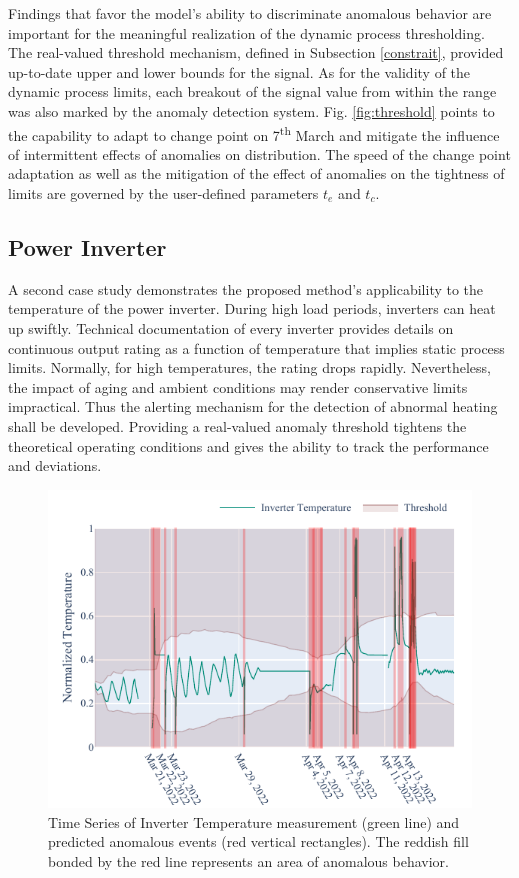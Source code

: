 Findings that favor the model's ability to discriminate anomalous behavior are important for the meaningful realization of the dynamic process thresholding. The real-valued threshold mechanism, defined in Subsection \ref{constrait}, provided up-to-date upper and lower bounds for the signal. As for the validity of the dynamic process limits, each breakout of the signal value from within the range was also marked by the anomaly detection system. Fig. \ref{fig:threshold} points to the capability to adapt to change point on 7\textsuperscript{th} March and mitigate the influence of intermittent effects of anomalies on distribution. The speed of the change point adaptation as well as the mitigation of the effect of anomalies on the tightness of limits are governed by the user-defined parameters $t_e$ and $t_c$.

\subsection{Power Inverter}\label{AA:Case2}
A second case study demonstrates the  proposed method's applicability to the temperature of the power inverter. During high load periods, inverters can heat up swiftly. Technical documentation of every inverter provides details on continuous output rating as a function of temperature that implies static process limits. Normally, for high temperatures, the rating drops rapidly. Nevertheless, the impact of aging and ambient conditions may render conservative limits impractical. Thus the alerting mechanism for the detection of abnormal heating shall be developed. Providing a real-valued anomaly threshold tightens the theoretical operating conditions and gives the ability to track the performance and deviations. 

\begin{figure}[htbp]
\centerline{\includegraphics{figures/Inverter_Temperature_168_hours_sliding_thresh.pdf}}
\caption{Time Series of Inverter Temperature measurement (green line) and predicted anomalous events (red vertical rectangles). The reddish fill bonded by the red line represents an area of anomalous behavior.}
\label{fig:cs2_threshold}
\end{figure}

